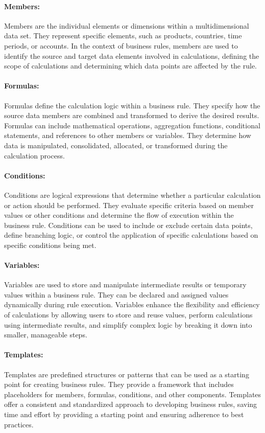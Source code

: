\documentclass[12pt,a4paper,openright,twoside]{book}
\begin{document}
\paragraph{Members:}
Members are the individual elements or dimensions within a multidimensional data set. 
%
They represent specific elements, such as products, countries, time periods, or accounts. 
%
In the context of business rules, members are used to identify the source and target data elements involved in calculations, defining the scope of calculations and determining which data points are affected by the rule.

\paragraph{Formulas:}
Formulas define the calculation logic within a business rule.
%
They specify how the source data members are combined and transformed to derive the desired results.
%
Formulas can include mathematical operations, aggregation functions, conditional statements, and references to other members or variables. 
%
They determine how data is manipulated, consolidated, allocated, or transformed during the calculation process.

\paragraph{Conditions:}
Conditions are logical expressions that determine whether a particular calculation or action should be performed. 
%
They evaluate specific criteria based on member values or other conditions and determine the flow of execution within the business rule. 
%
Conditions can be used to include or exclude certain data points, define branching logic, or control the application of specific calculations based on specific conditions being met.

\paragraph{Variables:}
Variables are used to store and manipulate intermediate results or temporary values within a business rule. %
They can be declared and assigned values dynamically during rule execution. 
%
Variables enhance the flexibility and efficiency of calculations by allowing users to store and reuse values, perform calculations using intermediate results, and simplify complex logic by breaking it down into smaller, manageable steps.

\paragraph{Templates:}
Templates are predefined structures or patterns that can be used as a starting point for creating business rules. 
%
They provide a framework that includes placeholders for members, formulas, conditions, and other components. 
%
Templates offer a consistent and standardized approach to developing business rules, saving time and effort by providing a starting point and ensuring adherence to best practices.
\end{document}
